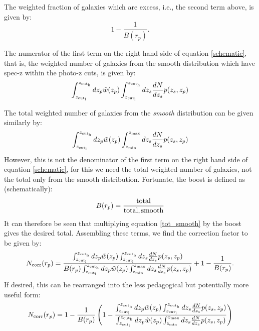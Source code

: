 \documentclass[onecolumn,amsmath,aps,fleqn, superscriptaddress]{revtex4}
\begin{document}
The weighted fraction of galaxies which are excess, i.e., the second term above, is given by:
\begin{equation}
1 - \frac{1}{B(r_p)}.
\label{frac_excess}
\end{equation}

The numerator of the first term on the right hand side of equation \ref{schematic}, that is, the weighted number of galaxies from the smooth distribution which have spec-z within the photo-z cuts, is given by:
\begin{equation}
\int_{z_{\rm cut_l}}^{z_{\rm cut_h}} dz_p \tilde{w}(z_p) \int_{z_{\rm cut_l}}^{z_{\rm cut_h}} dz_s\frac{dN}{dz_s} p(z_s, z_p)
\label{num_smooth_speczin}
\end{equation}

The total weighted number of galaxies from the {\it smooth} distribution can be given similarly by:
\begin{equation}
\int_{z_{\rm cut_l}}^{z_{\rm cut_h}} dz_p  \tilde{w}(z_p) \int_{z_{\rm min}}^{z_{\rm max}} dz_s\frac{dN}{dz_s} p(z_s, z_p)
\label{tot_smooth}
\end{equation}
However, this is not the denominator of the first term on the right hand side of equation \ref{schematic}, for this we need the total weighted number of galaxies, not the total only from the smooth distribution. Fortunate, the boost is defined as (schematically):
\begin{equation}
B(r_p) = \frac{ {\rm total}}{{\rm total, smooth}}
\label{boost_schm}
\end{equation}
It can therefore be seen that multiplying equation \ref{tot_smooth} by the boost gives the desired total. Assembling these terms, we find the correction factor to be given by:
\begin{equation}
N_{\rm corr}(r_p) = \frac{\int_{z_{\rm cut_l}}^{z_{\rm cut_h}} dz_p \tilde{w}(z_p) \int_{z_{\rm cut_l}}^{z_{\rm cut_h}} dz_s\frac{dN}{dz_s} p(z_s, z_p)}{B(r_p) \int_{z_{\rm cut_l}}^{z_{\rm cut_h}} dz_p  \tilde{w}(z_p) \int_{z_{\rm min}}^{z_{\rm max}} dz_s\frac{dN}{dz_s} p(z_s, z_p)} +1 - \frac{1}{B(r_p)}.
\label{Ncorr}
\end{equation}
If desired, this can be rearranged into the less pedagogical but potentially more useful form:
\begin{equation}
N_{\rm corr}(r_p) = 1 - \frac{1}{B(r_p)}\left(1 - \frac{\int_{z_{\rm cut_l}}^{z_{\rm cut_h}} dz_p \tilde{w}(z_p) \int_{z_{\rm cut_l}}^{z_{\rm cut_h}} dz_s\frac{dN}{dz_s} p(z_s, z_p)}{\int_{z_{\rm cut_l}}^{z_{\rm cut_h}} dz_p  \tilde{w}(z_p) \int_{z_{\rm min}}^{z_{\rm max}} dz_s\frac{dN}{dz_s} p(z_s, z_p)} \right)
\label{ncorr_2}
\end{equation}
\end{document}
